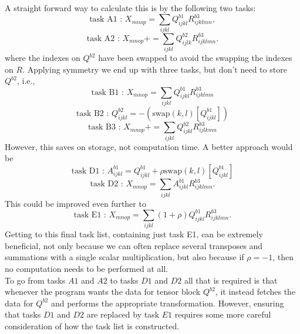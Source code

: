 \documentclass[12pt]{article}
\begin{document}
\noindent A straight forward way to calculate this is by the following two tasks:
\begin{equation*}
\text{task A1\ : \ \ \  \ } X_{mnop} = \sum_{ijkl}  Q^{b1}_{ijkl}R^{b3}_{ijklmn},
\end{equation*}                                                             
\begin{equation*}                                                           
\text{task A2\ : \ \ \  \ } X_{mnop} += \sum_{ijkl} Q^{b2}_{ijlk}R^{b3}_{ijklmn}.
\end{equation*}
where the indexes on $Q^{b2}$ have been swapped to avoid the swapping the indexes on $R$.
Applying symmetry we end up with three tasks, but don't need to store $Q^{b2}$, i.e., 
\begin{equation*}
\text{task B1\ : \ \ \  \ } X_{mnop} = \sum_{ijkl}  Q^{b1}_{ijkl}R^{b3}_{ijklmn}
\end{equation*}                                                             
\begin{equation*}                                                           
\text{task B2\ : \ \ \  \ } Q^{b2}_{ijkl} = - (\text{swap}(k,l)[ Q^{b1}_{ijkl}])
\end{equation*}
\begin{equation*}                                                           
\text{task B3\ : \ \ \  \ } X_{mnop} += \sum_{ijkl} Q^{b2}_{ijkl}R^{b3}_{ijlkmn}
\end{equation*}
However, this saves on storage, not computation time. A better approach would be
\begin{equation*}                                                           
\text{task D1\ : \ \ \  \ } A^{b1}_{ijkl} =  Q^{b1}_{ijkl} + \rho\text{swap}(k,l)[Q^{b1}_{ijkl}]
\end{equation*}
\begin{equation*}                                                           
\text{task D2\ : \ \ \  \ } X_{mnop} = \sum_{ijkl} A^{b1}_{ijkl}R^{b3}_{ijklmn}.
\end{equation*}
This could be improved even further to
\begin{equation*}                                                           
\text{task E1\ : \ \ \  \ } X_{mnop} = \sum_{ijkl} (1+\rho) Q^{b1}_{ijkl}R^{b3}_{ijklmn}.
\end{equation*}
\noindent Getting to this final task list, containing just task E1, can be
extremely beneficial, not only because we can often replace several transposes
and summations with a single scalar multiplication, but also because if $\rho =
-1$, then no computation needs to be performed at all.\\  

\noindent To go from tasks $A1$ and $A2$ to tasks $D1$ and $D2$ all that is
required is that whenever the program wants the data for tensor block $Q^{b2}$,
it instead fetches the data for $Q^{b2}$ and performs the appropriate
transformation. However, ensuring that tasks $D1$ and $D2$ are replaced by task
$E1$ requires some more careful consideration of how the task list is constructed. 
\end{document}
